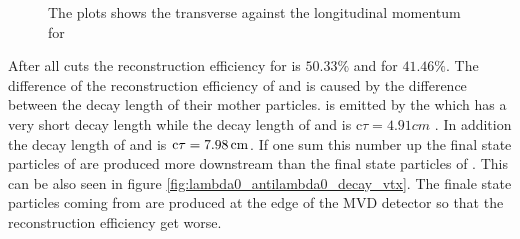 		\begin{figure}
			
			\caption{The plots shows the transverse against the longitudinal momentum for \lam}
			\label{fig:lambda0_pt_vs_pz}
		
		\end{figure}
		After all cuts the reconstruction efficiency for \lam is $50.33\%$ and for \alam $41.46\%$.
		The difference of the reconstruction efficiency of \lam and \alam is caused by the difference between the decay length of their mother particles.
		\lam is emitted by the \excitedcascade which has a very short decay length while the decay length of \cascade and \anticascade is c$\tau = 4.91 \unit{cm}$ \cite{PDG}.
		In addition the decay length of \lam and \alam is $\textnormal{c}\tau = 7.98 \, \textnormal{cm}$.
		If one sum this number up the final state particles of \alam are produced more downstream than the final state particles of \lam.
		This can be also seen in figure \ref{fig:lambda0_antilambda0_decay_vtx}.
		The finale state particles coming from \alam are produced at the edge of the MVD detector so that the reconstruction efficiency get worse.
		
